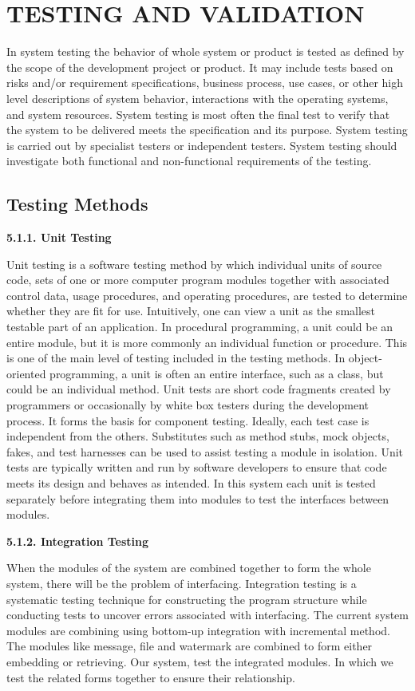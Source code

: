\chapter{TESTING AND VALIDATION}

In system testing the behavior of whole system or product is tested as defined by the scope of the development project or product. It may include tests based on risks and/or requirement specifications, business process, use cases, or other high level descriptions of system behavior, interactions with the operating systems, and system resources. System testing is most often the final test to verify that the system to be delivered meets the specification and its purpose. System testing is carried out by specialist testers or independent testers. System testing should investigate both functional and non-functional requirements of the testing. 
%
\section{Testing Methods}

{\bf5.1.1. Unit Testing}

 Unit testing is a software testing method by which individual units of source code, sets of one or more computer program modules together with associated control data, usage procedures, and operating procedures, are tested to determine whether they are fit for use. Intuitively, one can view a unit as the smallest testable part of an application. In procedural programming, a unit could be an entire module, but it is more commonly an individual function or procedure. This is one of the main level of testing included in the testing methods. In object-oriented programming, a unit is often an entire interface, such as a class, but could be an individual method. Unit tests are short code fragments created by programmers or occasionally by white box testers during the development process. It forms the basis for component testing. Ideally, each test case is independent from the others. Substitutes such as method stubs, mock objects, fakes, and test harnesses can be used to assist testing a module in isolation. Unit tests are typically written and run by software developers to ensure that code meets its design and behaves as intended. In this system each unit is tested separately before integrating them into modules to test the interfaces between modules. 

{\bf5.1.2. Integration Testing }

When the modules of the system are combined together to form the whole system, there will be the problem of interfacing. Integration testing is a systematic testing technique for constructing the program structure while conducting tests to uncover errors associated with interfacing. The current system modules are combining using bottom-up integration with incremental method. The modules like message, file and watermark are combined to form either embedding or retrieving. Our system, test the integrated modules. In which we test the related forms together to ensure their relationship. 


